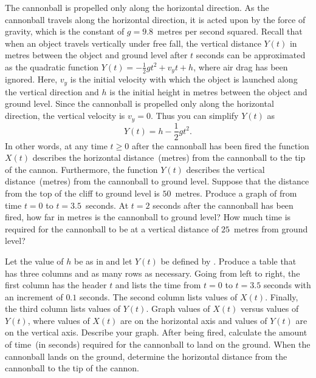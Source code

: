 \documentclass[a4paper,oneside,12pt]{article}
\begin{document}
\begin{problem}
\begin{packedenum}
  \item\label{subprob:trigonometric:cannon_cliff_vertical_displacement}
    The cannonball is propelled only along the horizontal direction.
    As the cannonball travels along the horizontal direction, it is
    acted upon by the force of gravity, which is the constant of
    $g = 9.8$~metres per second squared.  Recall that when an object
    travels vertically under free fall, the vertical distance $Y(t)$
    in metres between the object and ground level after $t$ seconds
    can be approximated as the quadratic function
    $Y(t) = -\frac{1}{2} gt^2 + v_yt + h$, where air drag has been
    ignored.  Here, $v_y$ is the initial velocity with which the
    object is launched along the vertical direction and $h$ is the
    initial height in metres between the object and ground level.
    Since the cannonball is propelled only along the horizontal
    direction, the vertical velocity is $v_y = 0$.  Thus you can
    simplify $Y(t)$ as
    \begin{equation}
    \label{eqn:trigonometric:cannon_cliff_vertical_displacement}
    Y(t)
    =
    h - \frac{1}{2}gt^2.
    \end{equation}
    In other words, at any time $t \geq 0$ after the cannonball has
    been fired the function $X(t)$ describes the horizontal
    distance~(metres) from the cannonball to the tip of the cannon.
    Furthermore, the function $Y(t)$ describes the vertical
    distance~(metres) from the cannonball to ground level.  Suppose
    that the distance from the top of the cliff to ground level is
    $50$~metres.  Produce a graph of
    from time $t = 0$ to $t = 3.5$~seconds.  At $t = 2$ seconds after
    the cannonball has been fired, how far in metres is the cannonball
    to ground level?  How much time is required for the cannonball to
    be at a vertical distance of $25$~metres from ground level?

  \item\label{subprob:trigonometric:cannon_cliff_time_to_ground}
    Let the value of $h$ be as
    in 
    and let $Y(t)$ be defined by
    .
    Produce a table that has three columns and as many rows as
    necessary.  Going from left to right, the first column has the
    header $t$ and lists the time from $t = 0$ to $t = 3.5$ seconds
    with an increment of $0.1$ seconds.  The second column lists
    values of $X(t)$.  Finally, the third column lists values of
    $Y(t)$.  Graph values of $X(t)$ versus values of $Y(t)$, where
    values of $X(t)$ are on the horizontal axis and values of $Y(t)$
    are on the vertical axis.  Describe your graph.  After being
    fired, calculate the amount of time~(in seconds) required for the
    cannonball to land on the ground.  When the cannonball lands on
    the ground, determine the horizontal distance from the cannonball
    to the tip of the cannon.


\end{packedenum}
\end{problem}
\end{document}
